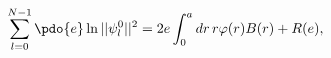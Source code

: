 \begin{equation}
\label{Eq_0503}
\sum^{N-1}_{l=0} \pdo{e}\ln ||\psi^0_l||^2
  = 2e \int^a_0 dr \, r \varphi(r) B(r) + R(e),
\end{equation}

